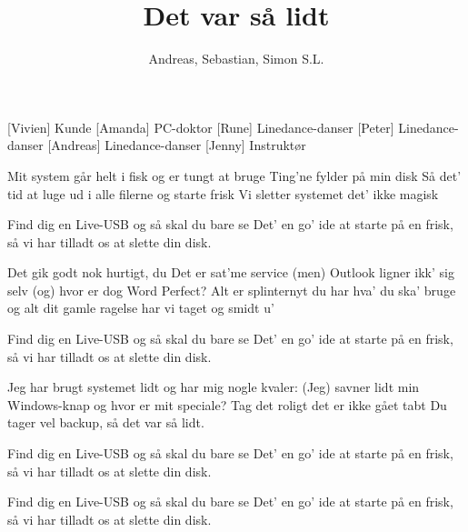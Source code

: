 \documentclass[a4paper,11pt]{article}
\title{Det var så lidt}
\author{Andreas, Sebastian, Simon S.L.}
\begin{document}
\maketitle

\begin{roles}
[Vivien] Kunde
[Amanda] PC-doktor
[Rune] Linedance-danser
[Peter] Linedance-danser
[Andreas] Linedance-danser
[Jenny] Instruktør
\end{roles}

\begin{song}
%
Mit system går helt i fisk
og er tungt at bruge
Ting'ne fylder på min disk
%
Så det' tid at luge
ud i alle filerne
og starte frisk
Vi sletter systemet
det' ikke magisk

%
Find dig en Live-USB
og så skal du bare se
Det' en go' ide at starte på en frisk,
så vi har tilladt os at slette din disk.
 
%
Det gik godt nok hurtigt, du
Det er sat'me service
(men) Outlook ligner ikk' sig selv
(og) hvor er dog Word Perfect?
%
Alt er splinternyt
du har hva' du ska' bruge
og alt dit gamle ragelse
har vi taget og smidt u'

%
Find dig en Live-USB
og så skal du bare se
Det' en go' ide at starte på en frisk,
så vi har tilladt os at slette din disk.
 
%
Jeg har brugt systemet lidt
og har mig nogle kvaler:
(Jeg) savner lidt min Windows-knap
og hvor er mit speciale?
%
Tag det roligt
det er ikke gået tabt
Du tager vel backup,
så det var så lidt.

%
Find dig en Live-USB
og så skal du bare se
Det' en go' ide at starte på en frisk,
så vi har tilladt os at slette din disk.


%
Find dig en Live-USB
og så skal du bare se
Det' en go' ide at starte på en frisk,
så vi har tilladt os at slette din disk.

\end{song}
\end{document}
